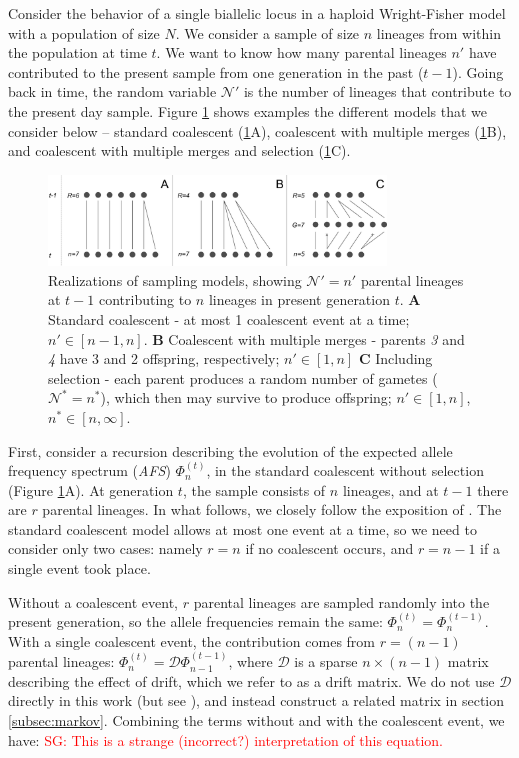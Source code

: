 \documentclass[review]{elsarticle}
\newcommand{\sgcomment}[1]{\textcolor{red}{SG: #1}}
\begin{document}
Consider the behavior of a single biallelic locus in a haploid Wright-Fisher model with a population
of size $N$. We consider a sample of size $n$ lineages from within the population at time $t$. We want to know
how many parental lineages $n'$ have contributed to the present sample from one generation in the
past ($t-1$). Going back in time, the random variable $\mathcal{N}'$ is the number of lineages that
contribute to the present day sample. Figure \ref{fig:schematic} shows examples the different models
that we consider below -- standard coalescent (\ref{fig:schematic}A), coalescent with multiple
merges (\ref{fig:schematic}B), and coalescent with multiple merges and selection
(\ref{fig:schematic}C).

\begin{figure}[ht]
  \centering
  \includegraphics[width=0.8\textwidth]{fig/schematic.pdf}
  \caption{\label{fig:schematic} Realizations of sampling models, showing $\mathcal{N}'=n'$ parental
    lineages at $t-1$ contributing to $n$ lineages in present generation $t$. \textbf{A} Standard
    coalescent - at most 1 coalescent event at a time; $n'\in[n-1, n]$. \textbf{B} Coalescent
    with multiple merges - parents \textit{3} and \textit{4} have 3 and 2 offspring, respectively;
    $n' \in [1, n]$ \textbf{C} Including selection - each parent produces a random number of gametes
    ($\mathcal{N}^*=n^*$), which then may survive to produce offspring; $n' \in [1, n]$, $n^* \in [n, \infty]$. }
\end{figure}

First, consider a recursion describing the evolution of the expected allele frequency spectrum
(\textit{AFS}) $\Phi_{n}^{(t)}$, in the standard coalescent without selection (Figure
\ref{fig:schematic}A). At generation $t$, the sample consists of $n$ lineages, and at $t-1$ there
are $r$ parental lineages. In what follows, we closely follow the exposition of
\cite{JouganousEtAl2017}. The standard coalescent model allows at most one event at a time, so we
need to consider only two cases: namely $r=n$ if no coalescent occurs, and $r=n-1$ if a single event
took place.

Without a coalescent event, $r$ parental lineages are sampled randomly into the present generation,
so the allele frequencies remain the same: $\Phi_{n}^{(t)}=\Phi_{n}^{(t-1)}$. With a single
coalescent event, the contribution comes from $r=(n-1)$ parental lineages:
$\Phi_{n}^{(t)}=\mathcal{D}\Phi_{n-1}^{(t-1)}$, where $\mathcal{D}$ is a sparse $n \times (n-1)$
matrix describing the effect of drift, which we refer to as a drift matrix. We do not use
$\mathcal{D}$ directly in this work (but see \citep{JouganousEtAl2017}), and instead construct a
related matrix in section \ref{subsec:markov}. Combining the terms without and with the coalescent
event, we have: \sgcomment{This is a strange (incorrect?) interpretation of this equation. }
\end{document}
